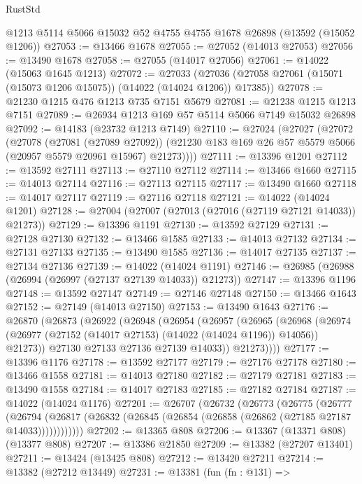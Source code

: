 \begin{lexlean}{RustStd}
\begin{coremodule}
    @1213
    @5114
    @5066
    @15032
    @52
    @4755
    @4755
    @1678
    @26898
    (@13592 (@15052 @1206))
@27053 := @13466 @1678
@27055 := @27052 (@14013 @27053)
@27056 := @13490 @1678
@27058 := @27055 (@14017 @27056)
@27061 := @14022 (@15063 @1645 @1213)
@27072 := @27033
    (@27036 (@27058 @27061 (@15071 (@15073 @1206 @15075)) (@14022 (@14024 @1206)) @17385))
@27078 := @21230 @1215 @476 @1213 @735 @7151 @5679
@27081 := @21238 @1215 @1213 @7151
@27089 := @26934 @1213 @169 @57 @5114 @5066 @7149 @15032 @26898
@27092 := @14183 (@23732 @1213 @7149)
@27110 := @27024
    (@27027
      (@27072
        (@27078
          (@27081 (@27089 @27092))
          (@21230 @183 @169 @26 @57 @5579 @5066 (@20957 @5579 @20961 @15967) @21273))))
@27111 := @13396 @1201
@27112 := @13592 @27111
@27113 := @27110 @27112
@27114 := @13466 @1660
@27115 := @14013 @27114
@27116 := @27113 @27115
@27117 := @13490 @1660
@27118 := @14017 @27117
@27119 := @27116 @27118
@27121 := @14022 (@14024 @1201)
@27128 := @27004 (@27007 (@27013 (@27016 (@27119 @27121 @14033)) @21273))
@27129 := @13396 @1191
@27130 := @13592 @27129
@27131 := @27128 @27130
@27132 := @13466 @1585
@27133 := @14013 @27132
@27134 := @27131 @27133
@27135 := @13490 @1585
@27136 := @14017 @27135
@27137 := @27134 @27136
@27139 := @14022 (@14024 @1191)
@27146 := @26985 (@26988 (@26994 (@26997 (@27137 @27139 @14033)) @21273))
@27147 := @13396 @1196
@27148 := @13592 @27147
@27149 := @27146 @27148
@27150 := @13466 @1643
@27152 := @27149 (@14013 @27150)
@27153 := @13490 @1643
@27176 := @26870
    (@26873
      (@26922
        (@26948
          (@26954
            (@26957
              (@26965
                (@26968
                  (@26974 (@26977 (@27152 (@14017 @27153) (@14022 (@14024 @1196)) @14056)) @21273))
                @27130
                @27133
                @27136
                @27139
                @14033))
            @21273))))
@27177 := @13396 @1176
@27178 := @13592 @27177
@27179 := @27176 @27178
@27180 := @13466 @1558
@27181 := @14013 @27180
@27182 := @27179 @27181
@27183 := @13490 @1558
@27184 := @14017 @27183
@27185 := @27182 @27184
@27187 := @14022 (@14024 @1176)
@27201 := @26707
    (@26732
      (@26773
        (@26775
          (@26777
            (@26794
              (@26817 (@26832 (@26845 (@26854 (@26858 (@26862 (@27185 @27187 @14033))))))))))))
@27202 := @13365 @808
@27206 := @13367 (@13371 @808) (@13377 @808)
@27207 := @13386 @21850
@27209 := @13382 (@27207 @13401)
@27211 := @13424 (@13425 @808)
@27212 := @13420 @27211
@27214 := @13382 (@27212 @13449)
@27231 := @13381
    (fun (fn : @131) =>

\end{coremodule}
\end{lexlean}
